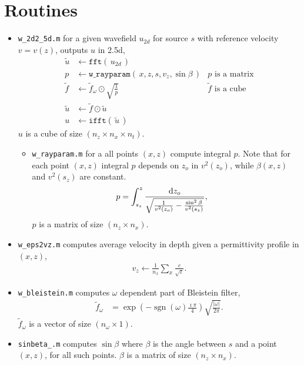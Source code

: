 \documentclass[a4paper,12pt]{article}
\begin{document}
\section*{Routines}
\begin{itemize}
\item \color{boiseBlue} \texttt{w\_2d2\_5d.m} \color{black} for a given wavefield $u_{2d}$ for source $s$ with reference velocity $v=v(z)$, outputs $u$ in 2.5d,
\begin{align*}
\tilde{u} &\gets \texttt{fft}(\,u_{2d}\,) \\
p &\gets \texttt{w\_rayparam}(\, x,z,s,v_z,\sin\beta \,) & \text{$p$ is a matrix} \\
\tilde{f} &\gets \tilde{f}_\omega \odot \sqrt{\frac{1}{p}} & \text{$\tilde{f}$ is a cube} \\
\tilde{u} &\gets \tilde{f}\odot\tilde{u}\\
u &\gets \texttt{ifft}(\,\tilde{u}\,)
\end{align*}
$u$ is a cube of size $(n_z\times n_x\times n_t)$.
\begin{itemize}
\item[\textbullet] \color{moradoAmor} \texttt{w\_rayparam.m} \color{black} for a all points $(x,z)$ compute integral $p$. Note that for each point $(x,z)$ integral $p$ depends on $z_o$ in $v^2(z_o)$, while $\beta(x,z)$ and $v^2(s_z)$ are constant.
\begin{align*}
p &= \int_{s_z}^{z} \frac{{\rm d}z_o}{\sqrt{ \frac{1}{v^2(z_o)} - \frac{\sin^2\beta}{v^2(s_z)} }},
\end{align*}
$p$ is a matrix of size $(n_z \times n_x)$.
\end{itemize}
\item[\textbullet] \color{boiseBlue} \texttt{w\_eps2vz.m} \color{black} computes average velocity in depth given a permittivity profile in $(x,z)$, 
\begin{align*}
v_z\gets \frac{1}{n_x} \sum_x \frac{c}{\sqrt{ \varepsilon }} .
\end{align*}
\item[\textbullet] \color{boiseBlue} \texttt{w\_bleistein.m} \color{black} computes $\omega$ dependent part of Bleistein filter,
\begin{align*}
\tilde{f}_\omega &= \exp\left(-\operatorname{sgn}(\omega) \frac{\imath\pi}{4}\right)\sqrt{\frac{|\omega|}{2\pi}}.
\end{align*}
$\tilde{f}_\omega$ is a vector of size $(n_\omega \times 1)$.
\item[\textbullet] \color{boiseBlue} \texttt{sinbeta\_.m} \color{black} computes $\sin\beta$ where $\beta$ is the angle between $s$ and a point $(x,z)$, for all such points. $\beta$ is a matrix of size $(n_z\times n_x)$.
\end{itemize}
%
\end{document}
